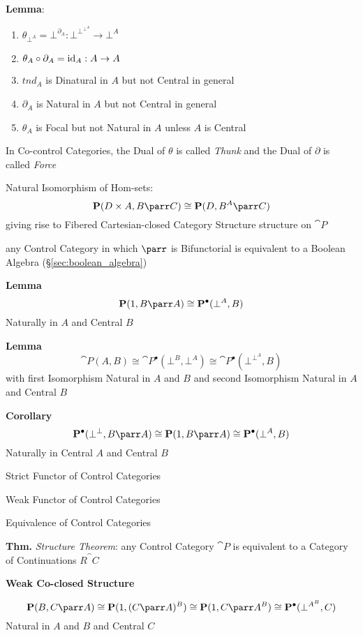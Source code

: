 \textbf{Lemma}:
\begin{enumerate}
  \item $\theta_{\bot^A} = \bot^{\partial_A} : \bot^{\bot^{\bot^A}}
    \rightarrow \bot^A$
  \item $\theta_A \circ \partial_A = \mathrm{id}_A : A \rightarrow A$
  \item $tnd_A$ is Dinatural in $A$ but not Central in general
  \item $\partial_A$ is Natural in $A$ but not Central in general
  \item $\theta_A$ is Focal but not Natural in $A$ unless $A$ is
    Central %
\end{enumerate}

In Co-control Categories, the Dual of $\theta$ is called \emph{Thunk}
and the Dual of $\partial$ is called \emph{Force}

Natural Isomorphism of Hom-sets:
\[
  \cat{P}(D \times A, B \parr C) \cong \cat{P}(D,B^A \parr C)
\]
giving rise to Fibered Cartesian-closed Category Structure structure
on $\cat{P}$

any Control Category in which $\parr$ is Bifunctorial is equivalent to
a Boolean Algebra (\S\ref{sec:boolean_algebra})

\textbf{Lemma}
\[
  \cat{P}(1,B \parr A) \cong \cat{P}^\bullet(\bot^A,B)
\]
Naturally in $A$ and Central $B$

\textbf{Lemma}
\[
  \cat{P}(A,B) \cong \cat{P}^\bullet(\bot^B,\bot^A) \cong
  \cat{P}^\bullet(\bot^{\bot^A},B)
\]
with first Isomorphism Natural in $A$ and $B$ and second Isomorphism
Natural in $A$ and Central $B$ %

\textbf{Corollary}
\[
  \cat{P}^\bullet(\bot^\bot,B \parr A) \cong
  \cat{P}(1,B \parr A) \cong
  \cat{P}^\bullet(\bot^A,B)
\]
Naturally in Central $A$ and Central $B$


\asterism


Strict Functor of Control Categories

Weak Functor of Control Categories

Equivalence of Control Categories

\textbf{Thm.} \emph{Structure Theorem}: any Control Category $\cat{P}$
is equivalent to a Category of Continuations $R^\cat{C}$ %


\textbf{Weak Co-closed Structure}

\[
  \cat{P}(B,C \parr A) \cong \cat{P}(1,(C \parr A)^B) \cong
    \cat{P}(1,C \parr A^B) \cong
    \cat{P}^\bullet(\bot^{A^B},C)
\]
Natural in $A$ and $B$ and Central $C$

